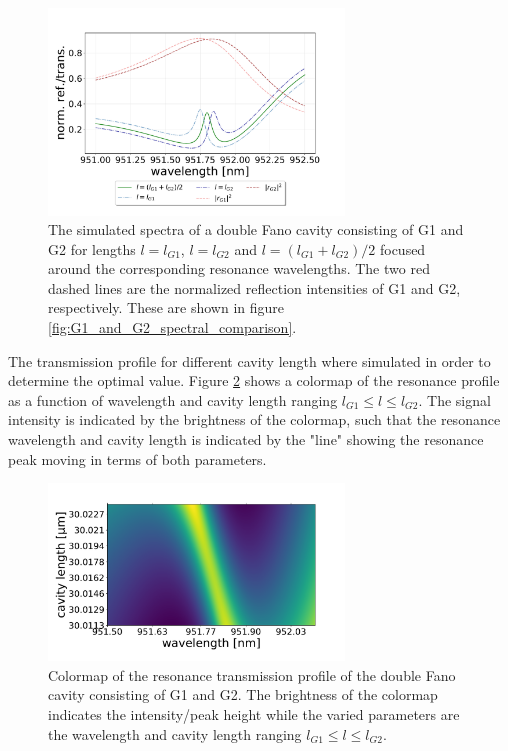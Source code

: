 \begin{figure}[h!]
    \centering
    \includegraphics[width=0.7\textwidth]{figures/results/M3:M5/M3:M5_sim_spectra_short.pdf}
    \caption{The simulated spectra of a double Fano cavity consisting of G1 and G2 for lengths $l=l_{G1}$, $l=l_{G2}$ and $l = (l_{G1}+l_{G2})/2$ focused around the corresponding resonance wavelengths. The two red dashed lines are the normalized reflection intensities of G1 and G2, respectively. These are shown in figure \ref{fig:G1_and_G2_spectral_comparison}.}
    \label{fig:G1_and_G2_short_range_spectra}
\end{figure}

The transmission profile for different cavity length where simulated in order to determine the optimal value. Figure \ref{fig:G1_G2_cmap} shows a colormap of the resonance profile as a function of wavelength and cavity length ranging $l_{G1} \leq l \leq l_{G2}$. The signal intensity is indicated by the brightness of the colormap, such that the resonance wavelength and cavity length is indicated by the "line" showing the resonance peak moving in terms of both parameters. 

\begin{figure}[h!]
    \centering
    \includegraphics[width=0.7\textwidth]{figures/results/M3:M5/G1:G2_cmap.pdf}
    \caption{Colormap of the resonance transmission profile of the double Fano cavity consisting of G1 and G2. The brightness of the colormap indicates the intensity/peak height while the varied parameters are the wavelength and cavity length ranging $l_{G1} \leq l \leq l_{G2}$.}
    \label{fig:G1_G2_cmap}
\end{figure}


